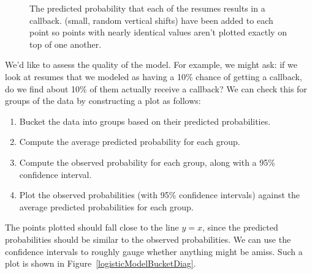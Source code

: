 \begin{figure}[h]
  \centering
  \caption{The predicted probability that each of the
      \resN{} resumes results in a callback.
      (small, random vertical shifts) have been added
      to each point so points with nearly identical
      values aren't plotted exactly on top of one another.}
  \label{logisticModelPredict}
\end{figure}

We'd like to assess the quality of the model.
For example, we might ask:
if we look at resumes that we modeled as having
a 10\% chance of getting a callback, do we find
about 10\% of them actually receive a callback?
We can check this for groups of the data by constructing
a plot as follows:
\begin{enumerate}
\item
    Bucket the data into groups based on their
    predicted probabilities.
\item
    Compute the average predicted probability for each group.
\item
    Compute the observed probability for each group,
    along with a 95\% confidence interval.
\item
    Plot the observed probabilities
    (with 95\% confidence intervals)
    against the average predicted probabilities for each group.
\end{enumerate}
The points plotted should fall close to the line $y = x$,
since the predicted probabilities should be similar to the
observed probabilities.
We can use the confidence intervals to roughly gauge whether
anything might be amiss.
Such a plot is shown in Figure~\ref{logisticModelBucketDiag}.

%

